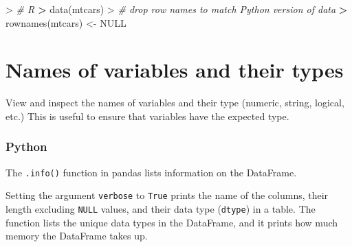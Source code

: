 \documentclass[
]{book}
\newenvironment{Shaded}{\begin{snugshade}}{\end{snugshade}}
\newcommand{\CommentTok}[1]{\textcolor[rgb]{0.56,0.35,0.01}{\textit{#1}}}
\newcommand{\ConstantTok}[1]{\textcolor[rgb]{0.00,0.00,0.00}{#1}}
\newcommand{\ErrorTok}[1]{\textcolor[rgb]{0.64,0.00,0.00}{\textbf{#1}}}
\newcommand{\FunctionTok}[1]{\textcolor[rgb]{0.00,0.00,0.00}{#1}}
\newcommand{\NormalTok}[1]{#1}
\newcommand{\OtherTok}[1]{\textcolor[rgb]{0.56,0.35,0.01}{#1}}
\newcommand{\SpecialCharTok}[1]{\textcolor[rgb]{0.00,0.00,0.00}{#1}}
\begin{document}
\begin{Shaded}
\begin{Highlighting}[]
\SpecialCharTok{\textgreater{}} \CommentTok{\# R}
\ErrorTok{\textgreater{}} \FunctionTok{data}\NormalTok{(mtcars)}
\SpecialCharTok{\textgreater{}} \CommentTok{\# drop row names to match Python version of data}
\ErrorTok{\textgreater{}} \FunctionTok{rownames}\NormalTok{(mtcars) }\OtherTok{\textless{}{-}} \ConstantTok{NULL}
\end{Highlighting}
\end{Shaded}

\hypertarget{names-of-variables-and-their-types}{%
\section{Names of variables and their types}\label{names-of-variables-and-their-types}}

View and inspect the names of variables and their type (numeric, string, logical, etc.) This is useful to ensure that variables have the expected type.

\hypertarget{python-14}{%
\subsubsection*{Python}\label{python-14}}

The \texttt{.info()} function in pandas lists information on the DataFrame.

Setting the argument \texttt{verbose} to \texttt{True} prints the name of the columns, their length excluding \texttt{NULL} values, and their data type (\texttt{dtype}) in a table. The function lists the unique data types in the DataFrame, and it prints how much memory the DataFrame takes up.
\end{document}

